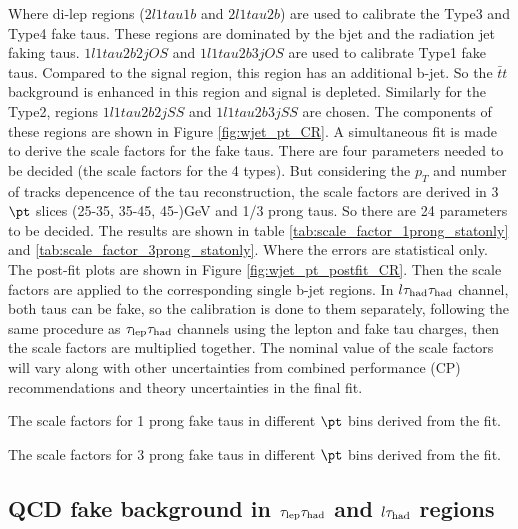 Where di-lep regions ($2l1tau1b$ and $2l1tau2b$) are used to calibrate the Type3 and Type4 fake taus. These regions are dominated by the bjet and the radiation jet faking taus. $1l1tau2b2j OS$ and $1l1tau2b3j OS$ are used to calibrate Type1 fake taus. Compared to the signal region, this region has an additional b-jet. So the $\bar{t}t$ background is enhanced in this region and signal is depleted. Similarly for the Type2, regions $1l1tau2b2j SS$ and $1l1tau2b3j SS$ are chosen. The components of these regions are shown in Figure \ref{fig:wjet_pt_CR}. A simultaneous fit is made to derive the scale factors for the fake taus. There are four parameters needed to be decided (the scale factors for the 4 types). But considering the $p_{T}$ and number of tracks depencence of the tau reconstruction, the scale factors are derived in 3 $\pt$ slices (25-35, 35-45, 45-)GeV and 1/3 prong taus. So there are 24 parameters to be decided. The results are shown in table \ref{tab:scale_factor_1prong_statonly} and \ref{tab:scale_factor_3prong_statonly}. Where the errors are statistical only. The post-fit plots are shown in Figure \ref{fig:wjet_pt_postfit_CR}. Then the scale factors are applied to the corresponding single b-jet regions. In $l\tau_\text{had}{}\tau_\text{had}$ channel, both taus can be fake, so the calibration is done to them separately, following the same procedure as $\tau_\text{lep}{}\tau_\text{had}$ channels using the lepton and fake tau charges, then the scale factors are multiplied together. The nominal value of the scale factors will vary along with other uncertainties from combined performance (CP) recommendations and theory uncertainties in the final fit.

\begin{table}
\caption{The scale factors for 1 prong fake taus in different $\pt$ bins derived from the fit.}
\label{tab:scale_factor_1prong_statonly}

\end{table}
\begin{table}
\caption{The scale factors for 3 prong fake taus in different $\pt$ bins derived from the fit.}
\label{tab:scale_factor_3prong_statonly}

\end{table}





\subsection{QCD fake background in $\tau_\text{lep}{}\tau_\text{had}$ and $l\tau_\text{had}$ regions}


